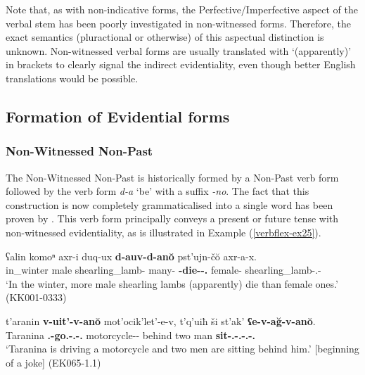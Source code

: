 Note that, as with non-indicative forms, the Perfective/Imperfective aspect of the verbal stem has been poorly investigated in non-witnessed forms. Therefore, the exact semantics (pluractional or otherwise) of this aspectual distinction is unknown. Non-witnessed verbal forms are usually translated with `(apparently)' in brackets to clearly signal the indirect evidentiality, even though better English translations would be possible. 


\subsection{Formation of Evidential forms} \label{evidform}

\subsubsection{Non-Witnessed Non-Past}

The Non-Witnessed Non-Past is historically formed by a Non-Past verb form followed by the verb form \textit{d-a} `be' with a suffix \textit{-no}. The fact that this construction is now completely grammaticalised into a single word has been proven by \textcite{harris09}. This verb form principally conveys a present or future tense with non-witnessed evidentiality, as is illustrated in  Example (\ref{verbflex-ex25}).



\begin{exe}
	\ex\label{verbflex-ex25}
	\begin{xlist}
		
		
			\ex\label{verbflex-ex25a}
			\gll  ʕalin komoⁿ axr-i duq-ux \textbf{d-auv-d-an\u{o}} pst'ujn-č\u{o} axr-a-x. \\
			in\_winter male shearling\_lamb-{\Pl} many-{\Cmp} \textbf{{\D}-die-{\D}-{\Nw}.{\Npst}} female-{\Obl} shearling\_lamb-{\Obl}.{\Pl}-{\Cont} \\
			\trans `In the winter, more male shearling lambs (apparently) die than female ones.'
			\hfill (KK001-0333)
		
		
		
			\ex\label{verbflex-ex25b}
			\gll t'aranin \textbf{v-uit'-v-an\u{o}} mot'ocik'let'-e-v, t'q'uiħ ši st'ak' \textbf{ʕe-v-a\u{g}-v-an\u{o}}. \\
			Taranina \textbf{{\M}.{\Sg}-go.{\Ipfv}-{\M}.{\Sg}-{\Nw}.{\Npst}} motorcycle-{\Obl}-{\Ins} behind two man \textbf{sit-{\M}.{\Sg}-{\Lv}.{\Sg}-{\M}.{\Sg}-{\Nw}.{\Npst}} \\
			\trans `Taranina is driving a motorcycle and two men are sitting behind him.' [beginning of a joke]
			\hfill (EK065-1.1)
		
		
	\end{xlist}
\end{exe}

